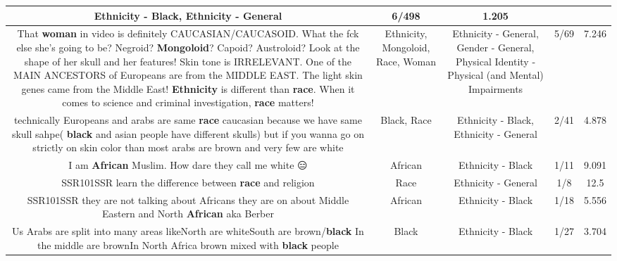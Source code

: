 \documentclass[11pt]{article}
\newlength\mylength
\begin{document}
\begin{center}
\begin{longtable}{|C{.65\mylength}|C{.30\mylength}|C{.12\mylength}|C{.12\mylength}|C{.12\mylength}|}
Ethnicity - Black, Ethnicity - General & 6/498 & 1.205 \\  \hline
  \small That \textbf{woman} in video is definitely CAUCASIAN/CAUCASOID. What the fck else she's going to be? Negroid? \textbf{Mongoloid}? Capoid? Austroloid? Look at the shape of her skull and her features! Skin tone is IRRELEVANT. One of the MAIN ANCESTORS of Europeans are from the MIDDLE EAST. The light skin genes came from the Middle East! \textbf{Ethnicity} is different than \textbf{race}. When it comes to science and criminal investigation, \textbf{race} matters!\normalsize   & Ethnicity, Mongoloid, Race, Woman & Ethnicity - General, Gender - General, Physical Identity - Physical (and Mental) Impairments & 5/69 & 7.246 \\  \hline
  \small technically Europeans and arabs are same \textbf{race} caucasian because we have same skull sahpe( \textbf{black} and asian people have different skulls) but if you wanna go on strictly on skin color than most arabs are brown and very few are white\normalsize   & Black, Race & Ethnicity - Black, Ethnicity - General & 2/41 & 4.878 \\  \hline
  \small I am \textbf{African} Muslim. How dare they call me white 😑\normalsize   & African & Ethnicity - Black & 1/11 & 9.091 \\  \hline
  \small SSR101SSR learn the difference between \textbf{race} and religion\normalsize   & Race & Ethnicity - General & 1/8 & 12.5 \\  \hline
  \small SSR101SSR they are not talking about Africans they are on about Middle Eastern and North \textbf{African} aka Berber\normalsize   & African & Ethnicity - Black & 1/18 & 5.556 \\  \hline
  \small Us Arabs are split into many areas likeNorth are whiteSouth are brown/\textbf{black} In the middle are brownIn North Africa brown mixed with \textbf{black} people\normalsize   & Black & Ethnicity - Black & 1/27 & 3.704 \\  \hline

\end{longtable}
\end{center}
\end{document}
